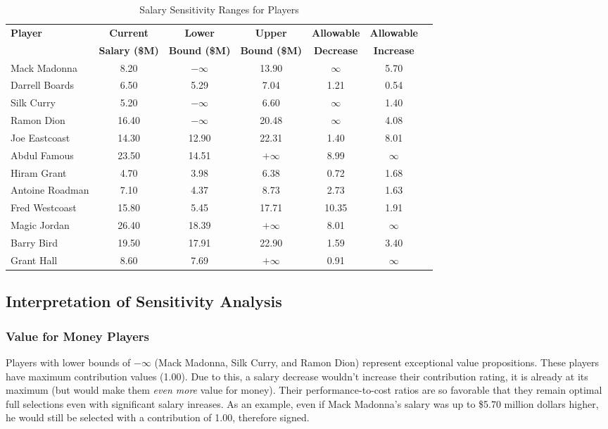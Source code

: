 \documentclass[a4paper,11pt]{article}
\begin{document}
\begin{table}[h!]
    \centering
    \label{tab:salary_sensitivity_lp}
    \begin{tabular}{lcccccc}
        \hline
        \textbf{Player} & \textbf{Current} & \textbf{Lower} & \textbf{Upper} & \textbf{Allowable} & \textbf{Allowable} \\
                       & \textbf{Salary (\$M)} & \textbf{Bound (\$M)} & \textbf{Bound (\$M)} & \textbf{Decrease} & \textbf{Increase} \\
        \hline
        Mack Madonna    & 8.20  & $-\infty$ & 13.90 & $\infty$ & 5.70 \\
        Darrell Boards  & 6.50  & 5.29      & 7.04  & 1.21     & 0.54 \\
        Silk Curry      & 5.20  & $-\infty$ & 6.60  & $\infty$ & 1.40 \\
        Ramon Dion      & 16.40 & $-\infty$ & 20.48 & $\infty$ & 4.08 \\
        Joe Eastcoast   & 14.30 & 12.90     & 22.31 & 1.40     & 8.01 \\
        Abdul Famous    & 23.50 & 14.51     & $+\infty$ & 8.99 & $\infty$ \\
        Hiram Grant     & 4.70  & 3.98      & 6.38  & 0.72     & 1.68 \\
        Antoine Roadman & 7.10  & 4.37      & 8.73  & 2.73     & 1.63 \\
        Fred Westcoast  & 15.80 & 5.45      & 17.71 & 10.35    & 1.91 \\
        Magic Jordan    & 26.40 & 18.39     & $+\infty$ & 8.01 & $\infty$ \\
        Barry Bird      & 19.50 & 17.91     & 22.90 & 1.59     & 3.40 \\
        Grant Hall      & 8.60  & 7.69      & $+\infty$ & 0.91 & $\infty$ \\
        \hline
    \end{tabular}
    \caption{Salary Sensitivity Ranges for Players}
\end{table}

\subsection{Interpretation of Sensitivity Analysis}

\subsubsection{Value for Money Players}
Players with lower bounds of $-\infty$ (Mack Madonna, Silk Curry, and Ramon Dion) represent exceptional value propositions. These players have maximum contribution values (1.00). Due to this, a salary decrease wouldn't increase their contribution rating, it is already at its maximum (but would make them \textit{even more} value for money). Their performance-to-cost ratios are so favorable that they remain optimal full selections even with significant salary inreases. As an example, even if Mack Madonna's salary was up to \$5.70 million dollars higher, he would still be selected with a contribution of 1.00, therefore signed.
\end{document}
